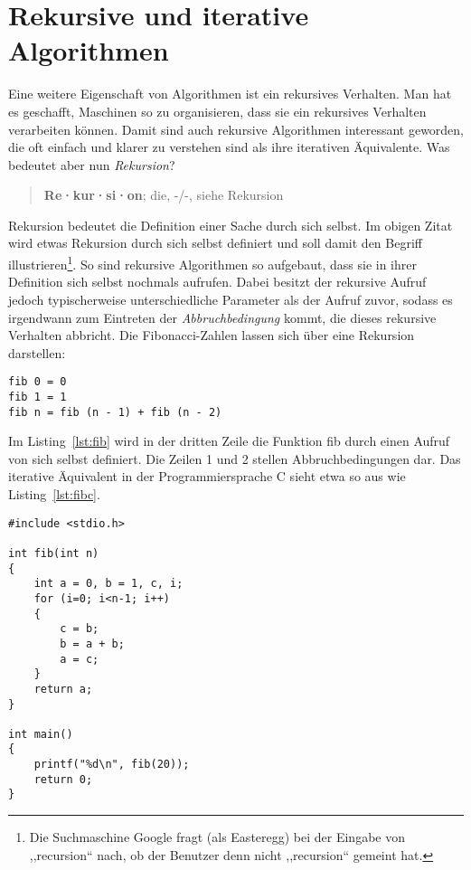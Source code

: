 \section{Rekursive und iterative Algorithmen}
%
Eine weitere Eigenschaft von Algorithmen ist ein rekursives Verhalten. Man hat es geschafft, Maschinen so zu organisieren, dass sie ein rekursives Verhalten verarbeiten können. Damit sind auch rekursive Algorithmen interessant geworden, die oft einfach und klarer zu verstehen sind als ihre iterativen Äquivalente. Was bedeutet aber nun \emph{Rekursion}?

\begin{quote}
   \textbf{Re·kur·si·on}; die, -/-, siehe Rekursion
\end{quote}

Rekursion bedeutet die Definition einer Sache durch sich selbst. Im obigen Zitat wird etwas Rekursion durch sich selbst definiert und soll damit den Begriff illustrieren\footnote{Die Suchmaschine Google fragt (als Easteregg) bei der Eingabe von ,,recursion`` nach, ob der Benutzer denn nicht ,,recursion`` gemeint hat.}. So sind rekursive Algorithmen so aufgebaut, dass sie in ihrer Definition sich selbst nochmals aufrufen. Dabei besitzt der rekursive Aufruf jedoch typischerweise unterschiedliche Parameter als der Aufruf zuvor, sodass es irgendwann zum Eintreten der \emph{Abbruchbedingung} kommt, die dieses rekursive Verhalten abbricht. Die Fibonacci-Zahlen lassen sich über eine Rekursion darstellen:

\begin{lstlisting}
fib 0 = 0
fib 1 = 1
fib n = fib (n - 1) + fib (n - 2)
\end{lstlisting}

Im Listing~\ref{lst:fib} wird in der dritten Zeile die Funktion fib durch einen Aufruf von sich selbst definiert. Die Zeilen 1 und 2 stellen Abbruchbedingungen dar. Das iterative Äquivalent in der Programmiersprache C sieht etwa so aus wie Listing~\ref{lst:fibc}. %
%
\begin{lstlisting}
#include <stdio.h>

int fib(int n)
{
    int a = 0, b = 1, c, i;
    for (i=0; i<n-1; i++)
    {
        c = b;
        b = a + b;
        a = c;
    }
    return a;
}

int main()
{
    printf("%d\n", fib(20));
    return 0;
}
\end{lstlisting}
%
